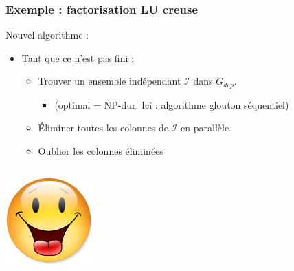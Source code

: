 \documentclass[xcolor={x11names,svgnames},x11names,svgnames]{beamer}
\begin{document}

\begin{frame}[label=sparse_lu_MIS]
  \frametitle{Exemple : factorisation LU creuse}

  \begin{block}{Nouvel algorithme :}
  \begin{itemize}
  \item Tant que ce n'est pas fini :
    \begin{itemize}
    \item Trouver un ensemble indépendant $\mathcal{I}$ dans $G_{dep}$.
      \begin{itemize}
      \item (optimal = NP-dur. Ici : algorithme glouton séquentiel)
      \end{itemize}
    \item Éliminer toutes les colonnes de $\mathcal{I}$ \alert{en parallèle}.
    \item \og Oublier\fg{} les colonnes éliminées
    \end{itemize}
  \end{itemize}
\end{block}

\bigskip

    \begin{columns}[c]
    \begin{column}{.1\textwidth}
      \includegraphics[width=\textwidth]{Content.png}
    \end{column}
    \begin{column}[c]{.9\textwidth}


\end{column}
\end{columns}
\end{frame}
\end{document}
